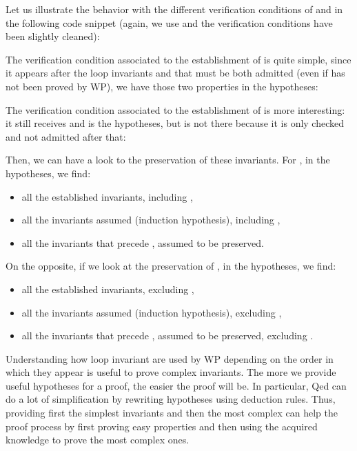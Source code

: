 Let us illustrate the behavior with the different verification conditions of
 and  in the following code snippet (again, we
use  and the verification conditions have been slightly
cleaned):




The verification condition associated to the establishment of  is
quite simple, since it appears after the loop invariants  and
 that must be both admitted (even if  has not been
proved by WP), we have those two properties in the hypotheses:




The verification condition associated to the establishment of  is
more interesting: it still receives  and  is the
hypotheses, but  is not there because it is only checked and not
admitted after that:




Then, we can have a look to the preservation of these invariants. For
, in the hypotheses, we find:
\begin{itemize}
  \item all the established invariants, including ,
  \item all the invariants assumed (induction hypothesis), including ,
  \item all the invariants that precede , assumed to be preserved.
\end{itemize}




On the opposite, if we look at the preservation of , in the
hypotheses, we find:
\begin{itemize}
  \item all the established invariants, excluding ,
  \item all the invariants assumed (induction hypothesis), excluding ,
  \item all the invariants that precede , assumed to be preserved,
        excluding .
\end{itemize}




Understanding how loop invariant are used by WP depending on the order in which
they appear is useful to prove complex invariants. The more we provide useful
hypotheses for a proof, the easier the proof will be. In particular, Qed can do
a lot of simplification by rewriting hypotheses using deduction rules. Thus,
providing first the simplest invariants and then the most complex can help the
proof process by first proving easy properties and then using the acquired
knowledge to prove the most complex ones.


